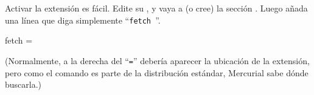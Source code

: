 Activar la extensión  es fácil. Edite su
, y vaya a (o cree) la sección
.  Luego añada una línea que diga simplemente
``\Verb+fetch +''.
\begin{codesample2}
  [extensions]
  fetch =
\end{codesample2}
(Normalmente, a la derecha del ``\texttt{=}'' debería aparecer la
ubicación de la extensión, pero como el comando  es parte
de la distribución estándar, Mercurial sabe dónde buscarla.)

